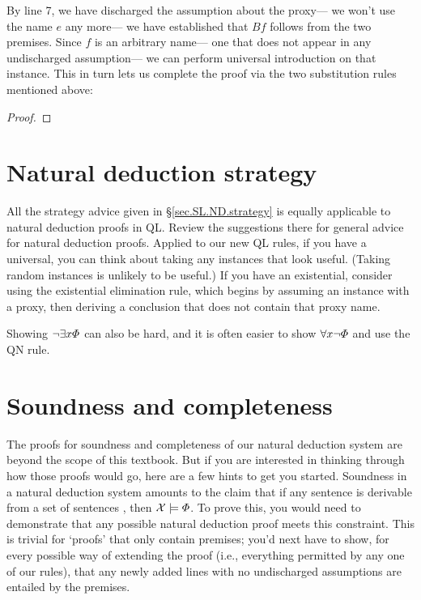 By line 7, we have discharged the assumption about the proxy--- we won't use the name $e$ any more--- we have established that $Bf$ follows from the two premises. Since $f$ is an arbitrary name--- one that does not appear in any undischarged assumption--- we can perform universal introduction on that instance. This in turn lets us complete the proof via the two substitution rules mentioned above:

\begin{proof}
	 
	\open
	\close
\end{proof}



\section{Natural deduction strategy}

All the strategy advice given in \S\ref{sec.SL.ND.strategy} is equally applicable to natural deduction proofs in QL. Review the suggestions there for general advice for natural deduction proofs. Applied to our new QL rules, if you have a universal, you can think about taking any instances that look useful. (Taking random instances is unlikely to be useful.) If you have an existential, consider using the existential elimination rule, which begins by assuming an instance with a proxy, then deriving a conclusion that does not contain that proxy name.

Showing $\neg \exists x\varPhi{}$ can also be hard, and it is often easier to show  $\forall x\neg \varPhi{}$ and use the QN rule.



\section{Soundness and completeness}

The proofs for soundness and completeness of our natural deduction system are beyond the scope of this textbook. But if you are interested in thinking through how those proofs would go, here are a few hints to get you started. Soundness in a natural deduction system amounts to the claim that if any sentence \metaA{} is derivable from a set of sentences \metaSetX{}, then $\mathcal{X}{}\models\varPhi{}$. To prove this, you would need to demonstrate that any possible natural deduction proof meets this constraint. This is trivial for `proofs' that only contain premises; you'd next have to show, for every possible way of extending the proof (i.e., everything permitted by any one of our rules), that any newly added lines with no undischarged assumptions are entailed by the premises.


